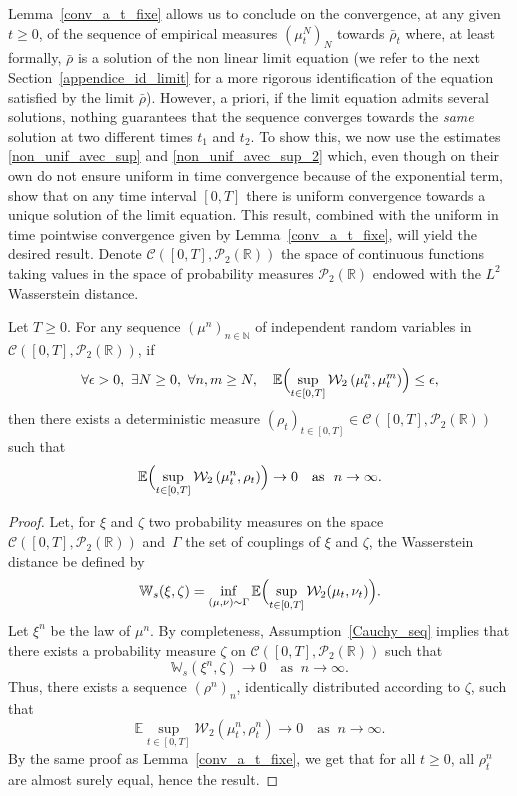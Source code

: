 Lemma~\ref{conv_a_t_fixe} allows us to conclude on the convergence, at any given $t\geq0$, of the sequence of empirical measures $(\mu^N_t)_N$ towards $\bar{\rho}_t$ where, at least formally, $\bar{\rho}$ is a solution of the non linear limit equation (we refer to the next Section~\ref{appendice_id_limit} for a more rigorous identification of the equation satisfied by the limit $\bar{\rho}$). However, a priori, if the limit equation admits several solutions, nothing guarantees that the sequence converges towards the \textit{same} solution at two different times $t_1$ and $t_2$. To show this, we now use the estimates \eqref{non_unif_avec_sup} and \eqref{non_unif_avec_sup_2} which, even though on their own do not ensure uniform in time convergence because of the exponential term, show that on any time interval $[0,T]$ there is uniform convergence towards a unique solution of the limit equation. This result, combined with the uniform in time pointwise convergence given by Lemma~\ref{conv_a_t_fixe}, will yield the desired result.
Denote $\mathcal{C}([0,T],\mathcal{P}_2(\mathbb{R}))$ the space of continuous functions taking values in the space of probability measures $\mathcal{P}_2(\mathbb{R})$ endowed with the $L^2$ Wasserstein distance.

\begin{lemma}
Let $T\geq0$. For any sequence $(\mu^n)_{n\in\mathbb{N}}$ of independent random variables in $\mathcal{C}([0,T],\mathcal{P}_2(\mathbb{R}))$, if
\begin{equation}\label{Cauchy_seq}
\forall \epsilon>0,\ \exists N\geq0,\ \forall n,m\geq N,\quad \mathbb{E}\Bigl(\sup_{t\in[0,T]}\mathcal{W}_2\left(\mu_t^n,\mu_t^m\right)\Bigr)\leq\epsilon,
\end{equation}
then there exists a deterministic measure $(\rho_t)_{t\in[0,T]}\in\mathcal{C}([0,T],\mathcal{P}_2(\mathbb{R}))$ such that
\[
\mathbb{E}\Bigl(\sup_{t\in[0,T]}\mathcal{W}_2\left(\mu_t^n,\rho_t\right)\Bigr)\to 0\quad\text{as }\ n\to\infty.
\]
\end{lemma}

\begin{proof}
Let, for $\xi$ and $\zeta$ two probability measures on the space $\mathcal{C}([0,T],\mathcal{P}_2(\mathbb{R}))$ and~$\Gamma$ the set of couplings of $\xi$ and $\zeta$, the Wasserstein distance be defined by
\begin{equation}
\mathbb{W}_s(\xi,\zeta)=\inf_{(\mu,\nu)\sim\Gamma}\mathbb{E}\Bigl(\sup_{t\in[0,T]}\mathcal{W}_2(\mu_t,\nu_t)\Bigr).
\end{equation}
Let $\xi^n$ be the law of $\mu^n$. By completeness, Assumption~\eqref{Cauchy_seq} implies that there exists a probability measure $\zeta$ on $\mathcal{C}([0,T],\mathcal{P}_2(\mathbb{R}))$ such that
\[
\mathbb{W}_s(\xi^n,\zeta)\to 0\quad\text{as }\ n\to\infty.
\]
Thus, there exists a sequence $(\rho^n)_n$, identically distributed according to $\zeta$, such that
\[
\mathbb{E}\sup_{t\in[0,T]}\mathcal{W}_2\left(\mu^n_t,\rho^n_t\right)\to 0\quad\text{as }\ n\to\infty.
\]
By the same proof as Lemma~\ref{conv_a_t_fixe}, we get that for all $t\geq0$, all $\rho^n_t$ are almost surely equal, hence the result.
\end{proof}

